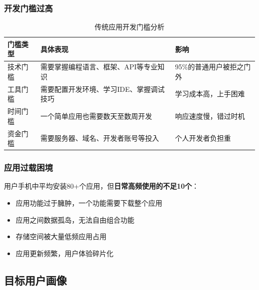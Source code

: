 \documentclass[a4paper,12pt]{ctexart}
\newcommand{\highlight}[1]{\textcolor{vivoblue}{\textbf{#1}}}
\begin{document}
\subsubsection{开发门槛过高}

\begin{table}[H]
    \centering
    \caption{传统应用开发门槛分析}
    \begin{tabularx}{\textwidth}{|l|X|X|}
        \hline
        \textbf{门槛类型} & \textbf{具体表现} & \textbf{影响} \\
        \hline
        技术门槛 & 需要掌握编程语言、框架、API等专业知识 & 95\%的普通用户被拒之门外 \\
        \hline
        工具门槛 & 需要配置开发环境、学习IDE、掌握调试技巧 & 学习成本高，上手困难 \\
        \hline
        时间门槛 & 一个简单应用也需要数天至数周开发 & 响应速度慢，错过时机 \\
        \hline
        资金门槛 & 需要服务器、域名、开发者账号等投入 & 个人开发者负担重 \\
        \hline
    \end{tabularx}
\end{table}

\subsubsection{应用过载困境}

用户手机中平均安装80+个应用，但\highlight{日常高频使用的不足10个}：

\begin{itemize}[leftmargin=2em]
    \item 应用功能过于臃肿，一个功能需要下载整个应用
    \item 应用之间数据孤岛，无法自由组合功能
    \item 存储空间被大量低频应用占用
    \item 应用更新频繁，用户体验碎片化
\end{itemize}

\subsection{目标用户画像}
\end{document}
